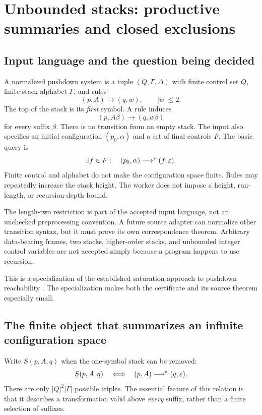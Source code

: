 \section{Unbounded stacks: productive summaries and closed exclusions}
\label{sec:pushdown}


\subsection{Input language and the question being decided}
A normalized pushdown system is a tuple $(Q,\Gamma,\Delta)$ with finite control
set $Q$, finite stack alphabet $\Gamma$, and rules
\[
   (p,A)\longrightarrow(q,w),\qquad |w|\leq 2.
\]
The top of the stack is its \emph{first} symbol. A rule induces
\[
   (p,A\beta)\longrightarrow(q,w\beta)
\]
for every suffix $\beta$. There is no transition from an empty stack. The input
also specifies an initial configuration $(p_0,\alpha)$ and a set of final
controls $F$. The basic query is
\begin{equation}
   \exists f\in F:\quad (p_0,\alpha)\longrightarrow^*(f,\varepsilon).
   \label{eq:pds-query}
\end{equation}
Finite control and alphabet do not make the configuration space finite. Rules
may repeatedly increase the stack height. The worker does not impose a height,
run-length, or recursion-depth bound.

The length-two restriction is part of the accepted input language, not an
unchecked preprocessing convention. A future source adapter can normalize
other transition syntax, but it must prove its own correspondence theorem.
Arbitrary data-bearing frames, two stacks, higher-order stacks, and unbounded
integer control variables are not accepted simply because a program happens
to use recursion.

This is a specialization of the established saturation approach to pushdown
reachability \cite{carayol-hague}. The specialization makes both the certificate
and its source theorem especially small.

\subsection{The finite object that summarizes an infinite configuration space}
Write $S(p,A,q)$ when the one-symbol stack can be removed:
\[
   S(p,A,q)\quad\Longleftrightarrow\quad
   (p,A)\longrightarrow^*(q,\varepsilon).
\]
There are only $|Q|^2|\Gamma|$ possible triples. The essential feature of this
relation is that it describes a transformation valid above \emph{every}
suffix, rather than a finite selection of suffixes.

